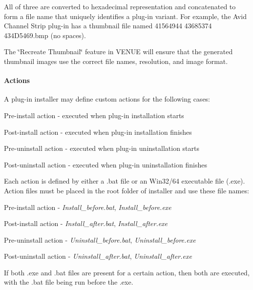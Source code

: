  All of three are converted to hexadecimal representation and concatenated to form a file name that uniquely identifies a plug-\/in variant. For example, the Avid Channel Strip plug-\/in has a thumbnail file named 41564944 43685374 434\+D5469.bmp (no spaces).

 The \char`\"{}\+Recreate Thumbnail\char`\"{} feature in V\+E\+N\+U\+E will ensure that the generated thumbnail images use the correct file names, resolution, and image format.

\hypertarget{a00377_subsubsection__aax_venue_guide__installer__optional_files__actions}{}\paragraph{Actions}\label{a00377_subsubsection__aax_venue_guide__installer__optional_files__actions}
 A plug-\/in installer may define custom actions for the following cases\+: 
\begin{DoxyEnumerate}
\item Pre-\/install action -\/ executed when plug-\/in installation starts 
\item Post-\/install action -\/ executed when plug-\/in installation finishes 
\item Pre-\/uninstall action -\/ executed when plug-\/in uninstallation starts 
\item Post-\/uninstall action -\/ executed when plug-\/in uninstallation finishes 
\end{DoxyEnumerate}

 Each action is defined by either a .bat file or an Win32/64 executable file (.exe). Action files must be placed in the root folder of installer and use these file names\+: 
\begin{DoxyEnumerate}
\item Pre-\/install action -\/ {\itshape Install\+\_\+before.\+bat}, {\itshape Install\+\_\+before.\+exe} 
\item Post-\/install action -\/ {\itshape Install\+\_\+after.\+bat}, {\itshape Install\+\_\+after.\+exe} 
\item Pre-\/uninstall action -\/ {\itshape Uninstall\+\_\+before.\+bat}, {\itshape Uninstall\+\_\+before.\+exe} 
\item Post-\/uninstall action -\/ {\itshape Uninstall\+\_\+after.\+bat}, {\itshape Uninstall\+\_\+after.\+exe} 
\end{DoxyEnumerate}

 If both .exe and .bat files are present for a certain action, then both are executed, with the .bat file being run before the .exe.

